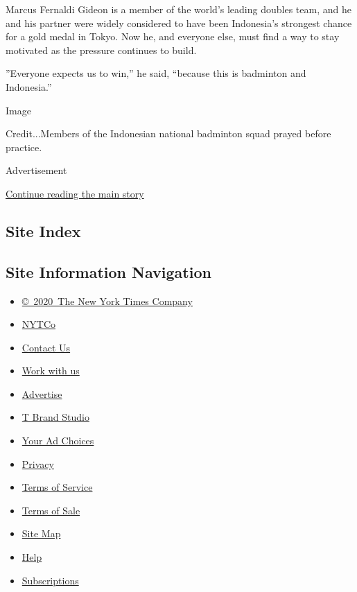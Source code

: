 Marcus Fernaldi Gideon is a member of the world's leading doubles team,
and he and his partner were widely considered to have been Indonesia's
strongest chance for a gold medal in Tokyo. Now he, and everyone else,
must find a way to stay motivated as the pressure continues to build.

''Everyone expects us to win,'' he said, ``because this is badminton and
Indonesia.''

Image

Credit...Members of the Indonesian national badminton squad prayed
before practice.~

Advertisement

\protect\hyperlink{after-bottom}{Continue reading the main story}

\hypertarget{site-index}{%
\subsection{Site Index}\label{site-index}}

\hypertarget{site-information-navigation}{%
\subsection{Site Information
Navigation}\label{site-information-navigation}}

\begin{itemize}
\tightlist
\item
  \href{https://help.nytimes.com/hc/en-us/articles/115014792127-Copyright-notice}{©~2020~The
  New York Times Company}
\end{itemize}

\begin{itemize}
\tightlist
\item
  \href{https://www.nytco.com/}{NYTCo}
\item
  \href{https://help.nytimes.com/hc/en-us/articles/115015385887-Contact-Us}{Contact
  Us}
\item
  \href{https://www.nytco.com/careers/}{Work with us}
\item
  \href{https://nytmediakit.com/}{Advertise}
\item
  \href{http://www.tbrandstudio.com/}{T Brand Studio}
\item
  \href{https://www.nytimes.com/privacy/cookie-policy\#how-do-i-manage-trackers}{Your
  Ad Choices}
\item
  \href{https://www.nytimes.com/privacy}{Privacy}
\item
  \href{https://help.nytimes.com/hc/en-us/articles/115014893428-Terms-of-service}{Terms
  of Service}
\item
  \href{https://help.nytimes.com/hc/en-us/articles/115014893968-Terms-of-sale}{Terms
  of Sale}
\item
  \href{https://spiderbites.nytimes.com}{Site Map}
\item
  \href{https://help.nytimes.com/hc/en-us}{Help}
\item
  \href{https://www.nytimes.com/subscription?campaignId=37WXW}{Subscriptions}
\end{itemize}
